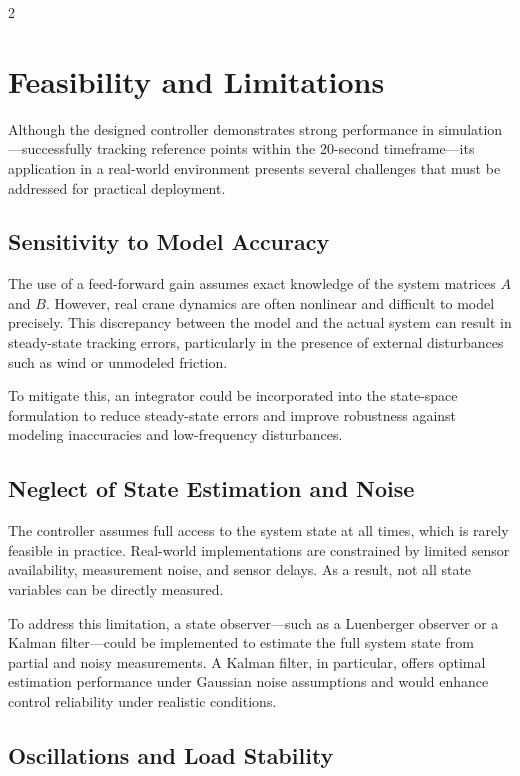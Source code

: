 \documentclass[12pt]{article}
\begin{document}
\begin{multicols}{2}
    
\section{Feasibility and Limitations}

Although the designed controller demonstrates strong performance in simulation—successfully tracking reference points within the 20-second timeframe—its application in a real-world environment presents several challenges that must be addressed for practical deployment.

\subsection{Sensitivity to Model Accuracy}

The use of a feed-forward gain assumes exact knowledge of the system matrices \( A \) and \( B \). However, real crane dynamics are often nonlinear and difficult to model precisely. This discrepancy between the model and the actual system can result in steady-state tracking errors, particularly in the presence of external disturbances such as wind or unmodeled friction.

To mitigate this, an integrator could be incorporated into the state-space formulation to reduce steady-state errors and improve robustness against modeling inaccuracies and low-frequency disturbances.

\subsection{Neglect of State Estimation and Noise}

The controller assumes full access to the system state at all times, which is rarely feasible in practice. Real-world implementations are constrained by limited sensor availability, measurement noise, and sensor delays. As a result, not all state variables can be directly measured.

To address this limitation, a state observer—such as a Luenberger observer or a Kalman filter—could be implemented to estimate the full system state from partial and noisy measurements. A Kalman filter, in particular, offers optimal estimation performance under Gaussian noise assumptions and would enhance control reliability under realistic conditions.

\subsection{Oscillations and Load Stability}


\end{multicols}
\end{document}
